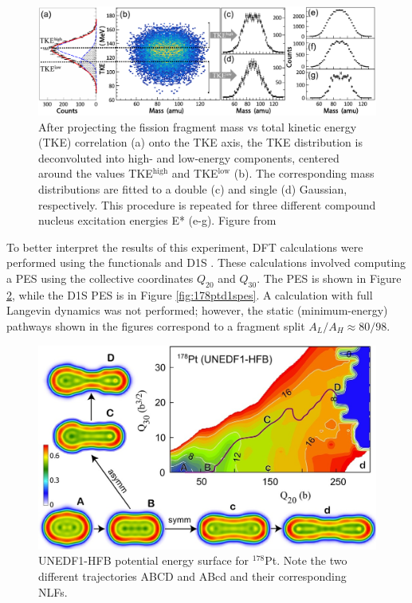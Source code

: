 \begin{figure}
	\centering
	\includegraphics[width=0.95\linewidth]{TeX_files/178Pt_expt_data}
	\caption[$^{178}$Pt experimental data]{After projecting the fission fragment mass vs total kinetic energy (TKE) correlation (a) onto the TKE axis, the TKE distribution is deconvoluted into high- and low-energy components, centered around the values TKE$^\mathrm{high}$ and TKE$^\mathrm{low}$ (b). The corresponding mass distributions are fitted to a double (c) and single (d) Gaussian, respectively. This procedure is repeated for three different compound nucleus excitation energies E* (e-g). Figure from \cite{Tsekhanovich2019}}
	\label{fig:178ptexptdata}
\end{figure}

To better interpret the results of this experiment, DFT calculations were performed using the functionals {\hfb} \cite{Schunck2015} and D1S \cite{Berger1989}. These calculations involved computing a PES using the collective coordinates $Q_{20}$ and $Q_{30}$. The {\hfb} PES is shown in Figure \ref{fig:178ptunedf1pes}, while the D1S PES is in Figure \ref{fig:178ptd1spes}. A calculation with full Langevin dynamics was not performed; however, the static (minimum-energy) pathways shown in the figures correspond to a fragment split $A_L/A_H \approx 80/98$.

\begin{figure}
	\centering
	\includegraphics[width=0.7\linewidth]{TeX_files/178Pt_unedf1_pes.jpg}
	\caption[UNEDF1-HFB potential energy surface for $^{178}$Pt]{UNEDF1-HFB potential energy surface for $^{178}$Pt. Note the two different trajectories ABCD and ABcd and their corresponding NLFs.}
	\label{fig:178ptunedf1pes}
\end{figure}

